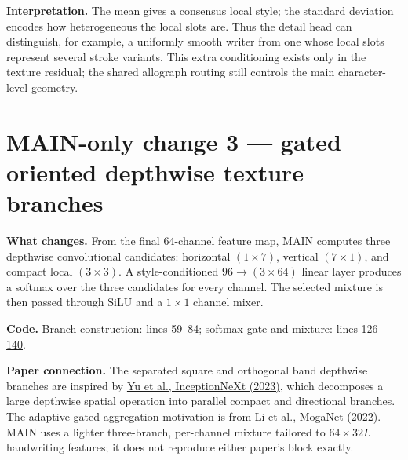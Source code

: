 \documentclass[10pt,a4paper]{article}
\newcommand{\paper}[2]{\href{#1}{#2}}
\begin{document}
\textbf{Interpretation.}  The mean gives a consensus local style; the standard deviation encodes how heterogeneous the local slots are.  Thus the detail head can distinguish, for example, a uniformly smooth writer from one whose local slots represent several stroke variants.  This extra conditioning exists only in the texture residual; the shared allograph routing still controls the main character-level geometry.

\section{MAIN-only change 3 --- gated oriented depthwise texture branches}

\textbf{What changes.}  From the final $64$-channel feature map, MAIN computes three depthwise convolutional candidates: horizontal $(1\times7)$, vertical $(7\times1)$, and compact local $(3\times3)$.  A style-conditioned $96\rightarrow(3\times64)$ linear layer produces a softmax over the three candidates for every channel.  The selected mixture is then passed through SiLU and a $1\times1$ channel mixer.

\textbf{Code.}  Branch construction: \href{https://github.com/rquq/HGGAN_test/blob/main/networks/texture_generator.py\#L59-L84}{lines 59--84}; softmax gate and mixture: \href{https://github.com/rquq/HGGAN_test/blob/main/networks/texture_generator.py\#L126-L140}{lines 126--140}.

\textbf{Paper connection.}  The separated square and orthogonal band depthwise branches are inspired by \paper{https://arxiv.org/abs/2303.16900}{Yu et al., InceptionNeXt (2023)}, which decomposes a large depthwise spatial operation into parallel compact and directional branches.  The adaptive gated aggregation motivation is from \paper{https://arxiv.org/abs/2211.03295}{Li et al., MogaNet (2022)}.  MAIN uses a lighter three-branch, per-channel mixture tailored to $64\times32L$ handwriting features; it does not reproduce either paper's block exactly.
\end{document}
